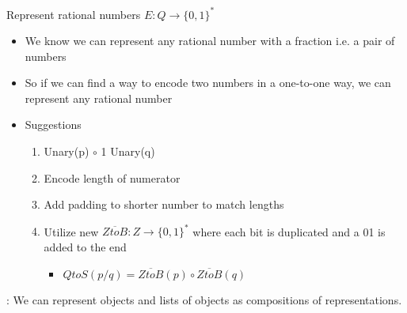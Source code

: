 \begin{example}
    Represent rational numbers $E: Q \rightarrow \{0,1\}^*$
    \begin{itemize}
        \item We know we can represent any rational number with a fraction i.e. a pair of numbers
        \item So if we can find a way to encode two numbers in a one-to-one way, we can represent any rational number
        \item Suggestions
        \begin{enumerate}
            \item Unary(p) $\circ$ 1 Unary(q)
            \item Encode length of numerator
            \item Add padding to shorter number to match lengths
            \item Utilize new $\overline{ZtoB}: Z \rightarrow \{0,1\}^*$ where each bit is duplicated and a 01 is added to the end
            \begin{itemize}
                \item $QtoS(p/q) = \overline{ZtoB}(p) \circ \overline{ZtoB}(q)$
            \end{itemize}
        \end{enumerate}
    \end{itemize}
\end{example}

\vspace{.5cm}

: We can represent objects and lists of objects as compositions of representations.